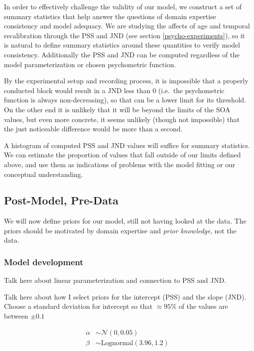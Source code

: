 \documentclass[11pt, oneside, openany]{scrbook}
\begin{document}
In order to effectively challenge the validity of our model, we construct a set of summary statistics that help answer the questions of domain expertise consistency and model adequacy. We are studying the affects of age and temporal recalibration through the PSS and JND (see section \ref{psycho-experiments}), so it is natural to define summary statistics around these quantities to verify model consistency. Additionally the PSS and JND can be computed regardless of the model parameterization or chosen psychometric function.

By the experimental setup and recording process, it is impossible that a properly conducted block would result in a JND less than 0 (i.e.~the psychometric function is always non-decreasing), so that can be a lower limit for its threshold. On the other end it is unlikely that it will be beyond the limits of the SOA values, but even more concrete, it seems unlikely (though not impossible) that the just noticeable difference would be more than a second.

A histogram of computed PSS and JND values will suffice for summary statistics. We can estimate the proportion of values that fall outside of our limits defined above, and use them as indications of problems with the model fitting or our conceptual understanding.

\hypertarget{post-model-pre-data}{%
\subsection{Post-Model, Pre-Data}\label{post-model-pre-data}}

We will now define priors for our model, still not having looked at the data. The priors should be motivated by domain expertise and \emph{prior knowledge}, not the data.

\hypertarget{model-development}{%
\subsubsection{Model development}\label{model-development}}

Talk here about linear parameterization and connection to PSS and JND.

Talk here about how I select priors for the intercept (PSS) and the slope (JND). Choose a standard deviation for intercept so that \(\approx 95\%\) of the values are between \(\pm 0.1\)

\begin{align*}
\alpha &\sim \mathcal{N}(0, 0.05) \\
\beta &\sim \mathrm{Lognormal}(3.96, 1.2)
\end{align*}
\end{document}
